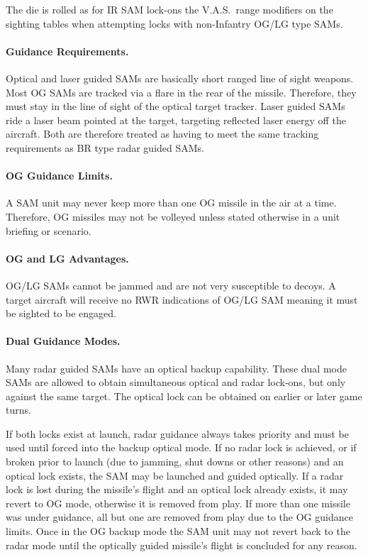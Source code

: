 The die is rolled as for IR SAM lock-ons the V.A.S.\ range modifiers on the sighting tables when attempting locks with non-Infantry OG/LG type SAMs.

\paragraph{Guidance Requirements.} Optical and laser guided SAMs are basically short ranged line of sight weapons. Most OG SAMs are tracked via a flare in the rear of the missile. Therefore, they must stay in the line of sight of the optical target tracker. Laser guided SAMs ride a laser beam pointed at the target, targeting reflected laser energy off the aircraft. Both are therefore treated as having to meet the same tracking requirements as BR type radar guided SAMs.

\paragraph{OG Guidance Limits.} A SAM unit may never keep more than one OG missile in the air at a time. Therefore, OG missiles may not be volleyed unless stated otherwise in a unit briefing or scenario.

\paragraph{OG and LG Advantages.} OG/LG SAMs cannot be jammed and are not very susceptible to decoys. A target aircraft will receive no RWR indications of OG/LG SAM meaning it must be sighted to be engaged.


\paragraph{Dual Guidance Modes.} Many radar guided SAMs have an optical backup capability. These dual mode SAMs are allowed to obtain simultaneous optical and radar lock-ons, but only against the same target. The optical lock can be obtained on earlier or later game turns.

If both locks exist at launch, radar guidance always takes priority and must be used until forced into the backup optical mode. If no radar lock is achieved, or if broken prior to launch (due to jamming, shut downs or other reasons) and an optical lock exists, the SAM may be launched and guided optically. If a radar lock is lost during the missile's flight and an optical lock already exists, it may revert to OG mode, otherwise it is removed from play. If more than one missile was under guidance, all but one are removed from play due to the OG guidance limits. Once in the OG backup mode the SAM unit may not revert back to the radar mode until the optically guided missile's flight is concluded for any reason.